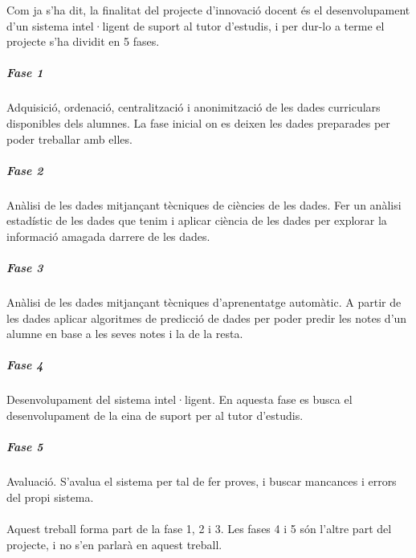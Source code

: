 \documentclass[12pt,a4paper,catalan]{article}
\begin{document}
Com ja s'ha dit, la finalitat del projecte d'innovació docent és el desenvolupament d'un sistema intel·ligent de suport al tutor d'estudis, i per dur-lo a terme el projecte s'ha dividit en 5 fases.

\subparagraph{Fase 1}
Adquisició, ordenació, centralització i anonimització de les dades curriculars disponibles dels alumnes. La fase inicial on es deixen les dades preparades per poder treballar amb elles.

\subparagraph{Fase 2}
Anàlisi de les dades mitjançant tècniques de ciències de les dades. Fer un anàlisi estadístic de les dades que tenim i aplicar ciència de les dades per explorar la informació amagada darrere de les dades.

\subparagraph{Fase 3}
Anàlisi de les dades mitjançant tècniques d’aprenentatge automàtic. A partir de les dades aplicar algoritmes de predicció de dades per poder predir les notes d'un alumne en base a les seves notes i la de la resta.

\subparagraph{Fase 4}
Desenvolupament del sistema intel·ligent. En aquesta fase es busca el desenvolupament de la eina de suport per al tutor d'estudis.

\subparagraph{Fase 5}
Avaluació. S'avalua el sistema per tal de fer proves, i buscar mancances i errors del propi sistema.
\\
\\
Aquest treball forma part de la fase 1, 2 i 3. Les fases 4 i 5 són l'altre part del projecte, i no s'en parlarà en aquest treball.
\end{document}
